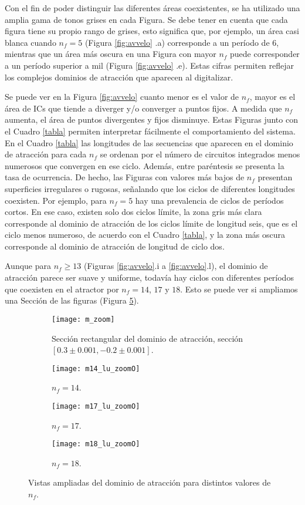 Con el fin de poder distinguir las diferentes áreas coexistentes, se ha utilizado una amplia gama de tonos grises en cada Figura.
Se debe tener en cuenta que cada figura tiene su propio rango de grises, esto significa que, por ejemplo, un área casi blanca cuando $n_f = 5$ (Figura \ref{fig:avvelo} .a) corresponde a un período de $6$, mientras que un área más oscura en una Figura con mayor $n_f$ puede corresponder a un período superior a mil (Figura \ref{fig:avvelo} .e).
Estas cifras permiten reflejar los complejos dominios de atracción que aparecen al digitalizar.

Se puede ver en la Figura \ref{fig:avvelo} cuanto menor es el valor de $n_f$, mayor es el área de ICs que tiende a diverger y/o converger a puntos fijos.
A medida que $n_f$ aumenta, el área de puntos divergentes y fijos disminuye.
Estas Figuras junto con el Cuadro \ref{tabla} permiten interpretar fácilmente el comportamiento del sistema.
En el Cuadro \ref{tabla} las longitudes de las secuencias que aparecen en el dominio de atracción para cada $n_f$ se ordenan por el número de circuitos integrados menos numerosos que convergen en ese ciclo.
Además, entre paréntesis se presenta la tasa de ocurrencia.
De hecho, las Figuras con valores más bajos de $n_f$ presentan superficies irregulares o rugosas, señalando que los ciclos de diferentes longitudes coexisten.
Por ejemplo, para $n_f = 5$ hay una prevalencia de ciclos de períodos cortos.
En ese caso, existen solo dos ciclos límite, la zona gris más clara corresponde al dominio de atracción de los ciclos límite de longitud seis, que es el ciclo menos numeroso, de acuerdo con el Cuadro \ref{tabla}, y la zona más oscura corresponde al dominio de atracción de longitud de ciclo dos.

Aunque para $n_f \geqslant 13$ (Figuras \ref{fig:avvelo}.i a \ref{fig:avvelo}.l), el dominio de atracción parece ser suave y uniforme, todavía hay ciclos con diferentes períodos que coexisten en el atractor por $ n_f = 14 $, $ 17 $ y $ 18 $.
Esto se puede ver si ampliamos una Sección de las figuras (Figura \ref{fig:m_zoom}).
%
\begin{figure}
	\centering
	\begin{subfigure}[t]{0.49\textwidth}
		\texttt{[image: m\_zoom]}
		\caption{Sección rectangular del dominio de atracción, sección $[0.3\pm 0.001, -0.2\pm 0.001]$.}
		\label{fig:gull}
	\end{subfigure}
	\hfill 
	\begin{subfigure}[t]{0.49\textwidth}
		\texttt{[image: m14\_lu\_zoomO]}
		\caption{$n_f=14$.}
		\label{fig:tiger}
	\end{subfigure}
	\hfill  
	\begin{subfigure}[t]{0.49\textwidth}
		\texttt{[image: m17\_lu\_zoomO]}
		\caption{$n_f=17$.}
		\label{fig:mouse}
	\end{subfigure}
	\hfill   
	\begin{subfigure}[t]{0.49\textwidth}
		\texttt{[image: m18\_lu\_zoomO]}
		\caption{$n_f=18$.}
		\label{fig:mouse}
	\end{subfigure}
	\caption{Vistas ampliadas del dominio de atracción para distintos valores de $n_f$.}\label{fig:m_zoom}
\end{figure}

